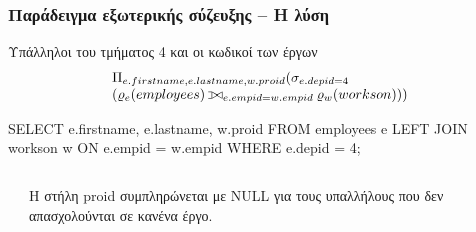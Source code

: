 \begin{frame}
\frametitle{Παράδειγμα εξωτερικής σύζευξης -- Η λύση}
\begin{minipage}{\wE}
\small
\vspace*{-0.5cm}
\begin{exampleblock}{\small Υπάλληλοι του τμήματος 4
              και οι κωδικοί των έργων}
\[
\begin{array}{l}
  \Pi_{e.firstname, e.lastname, w.proid}
  (\sigma_{e.depid=4}                    \\
    ( \varrho_{e}(employees) \lojoin_{e.empid = w.empid} \varrho_{w}(workson) )
  )
\end{array}
\]
\pause
\vspace*{-0.5cm}
\en
\begin{SQL}
  SELECT e.firstname, e.lastname, w.proid
    FROM employees e LEFT JOIN workson w
         ON e.empid = w.empid
   WHERE e.depid = 4;
\end{SQL}
\end{exampleblock}
\el
\small
\pause
\begin{columns}[T]
\begin{column}{0.55\linewidth}
\vspace{-0.4cm}
\end{column}
\begin{column}{0.4\linewidth}
\small
  \par Η στήλη {\ra proid} συμπληρώνεται με {\sq NULL}
       για τους υπαλλήλους που δεν απασχολούνται σε κανένα έργο.
\end{column}
\end{columns}
\end{minipage}
\end{frame}


